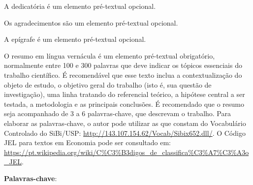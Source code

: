\documentclass[rec]{fearp}
\begin{document}
\imprimircapa
\imprimirfolhaderosto


\begin{dedicatoria}
\begin{flushright}
\vspace*{\fill}
\begin{minipage}{.52\textwidth}
A dedicatória é um elemento pré-textual opcional.
\end{minipage}
\end{flushright}
\end{dedicatoria}
\begin{agradecimentos}
Os agradecimentos são um elemento pré-textual opcional.
\end{agradecimentos}

\begin{epigrafe}
\begin{flushright}
\vspace*{\fill}
\begin{minipage}{.52\textwidth}
A epígrafe é um elemento pré-textual opcional.
\end{minipage}
\end{flushright}
\end{epigrafe}

\begin{resumo}
\vspace{\onelineskip}

O resumo em língua vernácula é um elemento pré-textual obrigatório, normalmente entre 100 e 300 palavras que deve indicar os tópicos essenciais do trabalho científico. É recomendável que esse texto inclua a contextualização do objeto de estudo, o objetivo geral do trabalho (isto é, sua questão de investigação), uma linha tratando do referencial teórico, a hipótese central a ser testada, a metodologia e as principais conclusões. É recomendado que o resumo seja acompanhado de 3 a 6 palavras-chave, que descrevam o trabalho. Para elaborar as palavras-chave, o autor pode utilizar as que constam do Vocabulário Controlado do SiBi/USP: \url{http://143.107.154.62/Vocab/Sibix652.dll/}. O Código JEL para textos em Economia pode ser consultado em: \url{https://pt.wikipedia.org/wiki/C\%C3\%B3digos\_de\_classifica\%C3\%A7\%C3\%A3o\_JEL}.

\vspace{\onelineskip}

\textbf{Palavras-chave}: 

\end{resumo}
\end{document}

